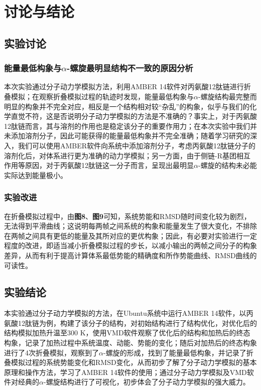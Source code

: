 \documentclass[12pt]{article}
\begin{document}
 	
\vbox{}  	
 	 \section{讨论与结论}
		\subsection{实验讨论}
 			\subsubsection{能量最低构象与$\alpha$-螺旋最明显结构不一致的原因分析}
本次实验通过分子动力学模拟方法，利用AMBER 14软件对丙氨酸12肽链进行折叠模拟；在观察折叠模拟过程的轨迹时发现，能量最低构象与$\alpha$-螺旋结构最完整而明显的构象并不完全对应，相反是一个结构相对较“杂乱”的构象，似乎与我们的化学直觉不符，这是否说明分子动力学模拟的方法是不准确的？事实上，对于丙氨酸12肽链而言，其与溶剂的作用也是稳定该分子的重要作用力；在本次实验中我们并未添加溶剂分子，因此可能获得的能量最低构象并不完全准确；随着学习研究的深入，我们可以使用AMBER软件向系统中添加溶剂分子，考虑丙氨酸12肽链分子的溶剂化后，对体系进行更为准确的动力学模拟；另一方面，由于侧链-R基团相互作用等原因，对于丙氨酸12肽链这一分子而言，呈现出最明显$\alpha$-螺旋的结构未必能实际达到能量极小。
 	 	\subsubsection{实验改进}

\par
在折叠模拟过程中，由\textbf{图8}、\textbf{图9}可知，系统势能和RMSD随时间变化较为剧烈，无法得到平滑曲线；这说明每两帧之间系统的构象和能量发生了很大变化，不排除在两帧之间具有更低的能量及其所对应的更优构象；因此，有必要对实验进行一定程度的改进，即适当减小折叠模拟过程的步长，以减小输出的两帧之间分子的构象差异，从而有利于提高计算体系最低势能的精确度和所作势能曲线、RMSD曲线的可读性。
 	 \subsection{实验结论}
本实验通过分子动力学模拟的方法，在Ubuntu系统中运行AMBER 14软件，以丙氨酸12肽链为例，构建了该分子的结构，对初始结构进行了结构优化，对优化后的结构模拟加热升温至300 K，使用VMD软件观察了优化后的结构和加热后的终态构象，记录了加热过程中系统温度、动能、势能的变化；随后对加热后的终态构象进行了4次折叠模拟，观察到了$\alpha$-螺旋的形成，找到了能量最低构象，并记录了折叠模拟过程的系统势能变化和RMSD变化，从而初步了解了分子动力学模拟的基本原理和操作方法，学习了AMBER 14软件的使用；通过分子动力学模拟及VMD软件对经典的$\alpha$-螺旋结构进行了可视化，初步体会了分子动力学模拟的强大威力。
 
 

   

\vbox{}  



\end{document}
